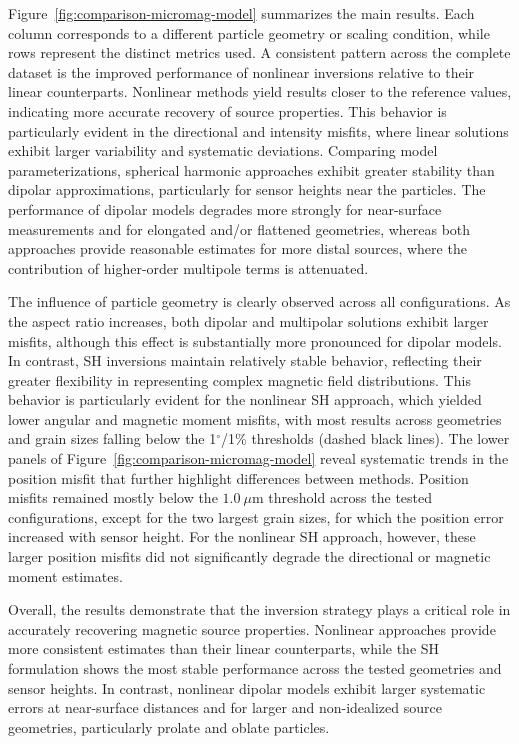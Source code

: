 Figure~\ref{fig:comparison-micromag-model} summarizes the main results. Each column corresponds to a different particle geometry or scaling condition, while rows represent the distinct metrics used. A consistent pattern across the complete dataset is the improved performance of nonlinear inversions relative to their linear counterparts. Nonlinear methods yield results closer to the reference values, indicating more accurate recovery of source properties. This behavior is particularly evident in the directional and intensity misfits, where linear solutions exhibit larger variability and systematic deviations. Comparing model parameterizations, spherical harmonic approaches exhibit greater stability than dipolar approximations, particularly for sensor heights near the particles. The performance of dipolar models degrades more strongly for near-surface measurements and for elongated and/or flattened geometries, whereas both approaches provide reasonable estimates for more distal sources, where the contribution of higher-order multipole terms is attenuated.

The influence of particle geometry is clearly observed across all configurations. As the aspect ratio increases, both dipolar and multipolar solutions exhibit larger misfits, although this effect is substantially more pronounced for dipolar models. In contrast, SH inversions maintain relatively stable behavior, reflecting their greater flexibility in representing complex magnetic field distributions. This behavior is particularly evident for the nonlinear SH approach, which yielded lower angular and magnetic moment misfits, with most results across geometries and grain sizes falling below the 1$^\circ$/1\% thresholds (dashed black lines). The lower panels of Figure~\ref{fig:comparison-micromag-model} reveal systematic trends in the position misfit that further highlight differences between methods. Position misfits remained mostly below the $1.0~\mu$m threshold across the tested configurations, except for the two largest grain sizes, for which the position error increased with sensor height. For the nonlinear SH approach, however, these larger position misfits did not significantly degrade the directional or magnetic moment estimates.

Overall, the results demonstrate that the inversion strategy plays a critical role in accurately recovering magnetic source properties. Nonlinear approaches provide more consistent estimates than their linear counterparts, while the SH formulation shows the most stable performance across the tested geometries and sensor heights. In contrast, nonlinear dipolar models exhibit larger systematic errors at near-surface distances and for larger and non-idealized source geometries, particularly prolate and oblate particles.

